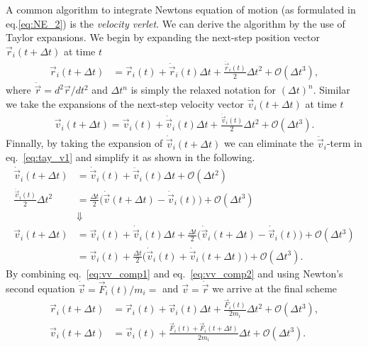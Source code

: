 A common algorithm to integrate Newtons equation of motion (as formulated in eq.\eqref{eq:NE_2}) is the \textit{velocity verlet}. We can derive the algorithm by the use of Taylor expansions. We begin by expanding the next-step position vector $\vec{r}_i(t + \Delta t)$ at time $t$
\begin{align}
  \vec{r}_i(t + \Delta t) &= \vec{r}_i(t) + \dot{\vec{r}}_i(t) \Delta t + \frac{\ddot{\vec{r}}_i(t)}{2} \Delta t^2 + \mathcal{O}(\Delta t^3) \label{eq:vv_comp1},
\end{align}
where $\ddot{\vec{r}} = d^2\vec{r}/dt^2$ and $\Delta t^n$ is simply the relaxed notation for $(\Delta t)^n$. Similar we take the expansions of the next-step velocity vector $\vec{v}_i(t+\Delta t)$ at time $t$ 
\begin{align}
  \vec{v}_i(t+\Delta t) = \vec{v}_i(t) + \dot{\vec{v}}_i(t) \Delta t + \frac{\ddot{\vec{v}}_i(t)}{2}\Delta t^2 + \mathcal{O}(\Delta t^3).
  \label{eq:tay_v1}
\end{align}
Finnally, by taking the expansion of $\dot{\vec{v}}_i(t+\Delta t)$ we can eliminate the $\ddot{\vec{v}}_i$-term in eq.~\eqref{eq:tay_v1} and simplify it as shown in the following.
\begin{align}
  \dot{\vec{v}}_i(t+\Delta t) &= \dot{\vec{v}}_i(t) + \ddot{\vec{v}}_i(t) \Delta t + \mathcal{O}(\Delta t^2) \nonumber \\
  \frac{\ddot{\vec{v}}_i(t)}{2}\Delta t^2 &= \frac{\Delta t}{2}\Big( \dot{\vec{v}}(t+\Delta t) - \dot{\vec{v}}_i(t)\Big) + \mathcal{O}(\Delta t^3) \nonumber \\
  &\Downarrow \nonumber \\
  \vec{v}_i(t+\Delta t) &= \vec{v}_i(t) + \dot{\vec{v}}_i(t) \Delta t + \frac{\Delta t}{2}\Big( \dot{\vec{v}}_i(t+\Delta t) - \dot{\vec{v}}_i(t)\Big) + \mathcal{O}(\Delta t^3) \nonumber \\
  &=  \vec{v}_i(t) + \frac{\Delta t}{2}\Big( \dot{\vec{v}}_i(t) +  \dot{\vec{v}}_i(t+\Delta t)\Big) + \mathcal{O}(\Delta t^3).
  \label{eq:vv_comp2}
\end{align}
By combining eq.~\eqref{eq:vv_comp1} and eq.~\eqref{eq:vv_comp2} and using Newton's second equation $\dot{\vec{v}} = \vec{F}_i(t)/m_i = $ and $\vec{v} = \dot{\vec{r}}$ we arrive at the final scheme
\begin{align*}
  \vec{r}_i(t + \Delta t) &= \vec{r}_i(t) + \vec{v}_i(t) \Delta t + \frac{\vec{F}_i(t)}{2m_i}\Delta t^2 + \mathcal{O}(\Delta t^3), \\
  \vec{v}_i(t+\Delta t)  &= \vec{v}_i(t) + \frac{\vec{F}_i(t) + \vec{F}_i(t+\Delta t)}{2m_i}  \Delta t + \mathcal{O}(\Delta t^3).
\end{align*}
